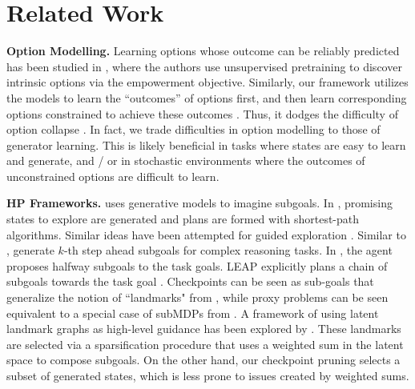 \section{Related Work}



\textbf{Option Modelling.}
Learning options whose outcome can be reliably predicted has been studied in \citet{gregor2016variational,Modhe_2020}, where the authors use unsupervised pretraining to discover intrinsic options via the empowerment objective. Similarly, our framework utilizes the models to learn the ``outcomes'' of options first, and then learn corresponding options constrained to achieve these outcomes \citep{sutton1999between,nasiriany2019planning}. Thus, it dodges the difficulty of option collapse \citep{bacon2017option}. In fact, we trade difficulties in option modelling to those of generator learning. This is likely beneficial in tasks where states are easy to learn and generate, and / or in stochastic environments where the outcomes of unconstrained options are difficult to learn.

\textbf{HP Frameworks.}
\citet{nair2018visual} uses generative models to imagine subgoals. In \citet{kim2021landmarkguided}, promising states to explore are generated and plans are formed with shortest-path algorithms. Similar ideas have been attempted for guided exploration \citep{erraqabi2021exploration,kulkarni2016hierarchical}. Similar to \citet{hafner2022deep}, \citet{czechowski2021subgoal} generate $k$-th step ahead subgoals for complex reasoning tasks. In \citet{chanesane2021goalconditioned}, the agent proposes halfway subgoals to the task goals. LEAP explicitly plans a chain of subgoals towards the task goal \citep{nasiriany2019planning}. Checkpoints can be seen as sub-goals that generalize the notion of ``landmarks" from \citet{sutton1999between}, while proxy problems can be seen equivalent to a special case of subMDPs from \citet{NEURIPS2020_4a5cfa92}. A framework of using latent landmark graphs as high-level guidance has been explored by \citet{zhang2021world}. These landmarks are selected via a sparsification procedure that uses a weighted sum in the latent space to compose subgoals. On the other hand, our checkpoint pruning selects a subset of generated states, which is less prone to issues created by weighted sums. 


